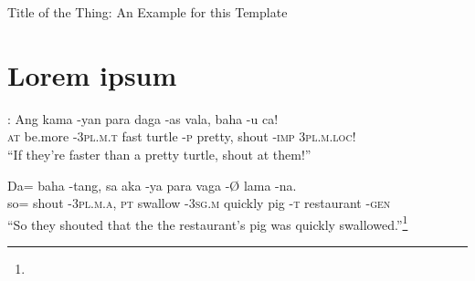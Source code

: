 \documentclass[12pt,paper=letter]{scrartcl}
\newcommand{\mor}[1]{\textsc{\lowercase{#1}}}
\newenvironment{mytitle}{
    \hfill
    \begin{minipage}{0.667\textwidth}
	\vspace{\baselineskip}
	\begin{center}
	    \Large
	    \sffamily\bfseries
}{
	\end{center}
	\vspace{1em}
    \end{minipage}
    \hfill
}
\begin{document}

\begin{mytitle}
    Title of the Thing: An Example for this Template
\end{mytitle}

\section{Lorem ipsum}
\lipsum[1]

\begin{exe}
    \ex \textcite[17]{blah}:
    \gll Ang kama    -yan           para daga   -as      vala,   baha  -u         ca! \\
    \mor{AT} be.more \mor{-3PL.M.T} fast turtle \mor{-P} pretty, shout \mor{-IMP} \mor{3PL.M.LOC}! \\
    \glt \enquote{If they're faster than a pretty turtle, shout at them!}
\end{exe}

\begin{exe}
    \ex 
    \gll Da= baha  -tang,          sa       aka     -ya          para    vaga -Ø       lama       -na. \\
         so= shout \mor{-3PL.M.A}, \mor{PT} swallow \mor{-3SG.M} quickly pig  \mor{-T} restaurant \mor{-GEN}\\
    \glt \enquote{So they shouted that the the restaurant’s pig was quickly swallowed.}\footnote{\lipsum[10]}
\end{exe}

\lipsum[2-5]


\nocite{*} %
\printbibliography
\end{document}
